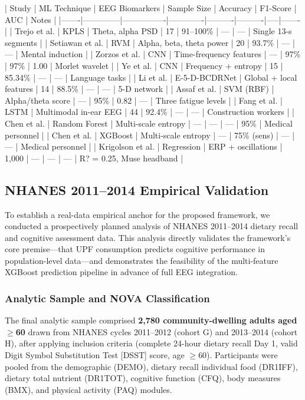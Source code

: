 \documentclass[journal,twoside,10pt]{IEEEtran}
\begin{document}
| Study | ML Technique | EEG Biomarkers | Sample Size | Accuracy | F1-Score | AUC | Notes |
|-------|--------------|----------------|-------------|----------|----------|-----|-------|
| Trejo et al. \cite{ref1,ref4} | KPLS | Theta, alpha PSD | 17 | 91--100\% | --- | --- | Single 13-s segments |
| Setiawan et al. \cite{ref9} | RVM | Alpha, beta, theta power | 20 | 93.7\% | --- | --- | Mental induction |
| Zorzos et al. \cite{ref10} | CNN | Time-frequency features | --- | 97\% | 97\% | 1.00 | Morlet wavelet |
| Ye et al. \cite{ref14} | CNN | Frequency + entropy | 15 | 85.34\% | --- | --- | Language tasks |
| Li et al. \cite{ref24} | E-5-D-BCDRNet | Global + local features | 14 | 88.5\% | --- | --- | 5-D network |
| Assaf et al. \cite{ref6,ref15} | SVM (RBF) | Alpha/theta score | --- | 95\% | 0.82 | --- | Three fatigue levels |
| Fang et al. \cite{ref25} | LSTM | Multimodal in-ear EEG | 44 | 92.4\% | --- | --- | Construction workers |
| Chen et al. \cite{ref26} | Random Forest | Multi-scale entropy | --- | --- | --- | 95\% | Medical personnel |
| Chen et al. \cite{ref26} | XGBoost | Multi-scale entropy | --- | 75\% (sens) | --- | --- | Medical personnel |
| Krigolson et al. \cite{ref23} | Regression | ERP + oscillations | 1,000 | --- | --- | --- | R? = 0.25, Muse headband |

\subsection{NHANES 2011--2014 Empirical Validation}

To establish a real-data empirical anchor for the proposed framework, we conducted a prospectively planned analysis of NHANES 2011--2014 dietary recall and cognitive assessment data. This analysis directly validates the framework's core premise---that UPF consumption predicts cognitive performance in population-level data---and demonstrates the feasibility of the multi-feature XGBoost prediction pipeline in advance of full EEG integration.

\subsubsection{Analytic Sample and NOVA Classification}

The final analytic sample comprised \textbf{2,780 community-dwelling adults aged $\geq$60} drawn from NHANES cycles 2011--2012 (cohort G) and 2013--2014 (cohort H), after applying inclusion criteria (complete 24-hour dietary recall Day 1, valid Digit Symbol Substitution Test [DSST] score, age $\geq$60). Participants were pooled from the demographic (DEMO), dietary recall individual food (DR1IFF), dietary total nutrient (DR1TOT), cognitive function (CFQ), body measures (BMX), and physical activity (PAQ) modules.
\end{document}
